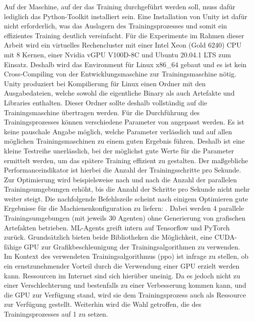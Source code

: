 Auf der Maschine, auf der das Training durchgeführt werden soll, muss dafür lediglich das Python-Toolkit installiert sein.
Eine Installation von Unity ist dafür nicht erforderlich, was das Auslagern des Trainingsprozesses und somit ein effizientes Training deutlich vereinfacht.
Für die Experimente im Rahmen dieser Arbeit wird ein virtuelles Rechencluster mit einer Intel Xeon (Gold 6240) CPU mit 8 Kernen, einer Nvidia vGPU V100D-8C und Ubuntu 20.04.1 LTS zum Einsatz.
Deshalb wird das Environment für Linux x86\_64 gebaut und es ist kein Cross-Compiling von der Entwicklungsmaschine zur Trainingsmaschine nötig.
Unity produziert bei Kompilierung für Linux einen Ordner mit den Ausgabedateien, welche sowohl die eigentliche Binary als auch Artefakte und Libraries enthalten.
Dieser Ordner sollte deshalb vollständig auf die Trainingsmaschine übertragen werden.
Für die Durchführung des Trainingsprozesses können verschiedene Parameter von  angepasst werden.
Es ist keine pauschale Angabe möglich, welche Parameter verlässlich und auf allen möglichen Trainingsmaschinen zu einem guten Ergebnis führen.
Deshalb ist eine kleine Testreihe unerlässlich, bei der möglichst gute Werte für die Parameter ermittelt werden, um das spätere Training effizient zu gestalten.
Der maßgebliche Performanceindikator ist hierbei die Anzahl der Trainingsschritte pro Sekunde.
Zur Optimierung wird beispielsweise nach und nach die Anzahl der parallelen Trainingsumgebungen erhöht, bis die Anzahl der Schritte pro Sekunde nicht mehr weiter steigt.
Die nachfolgende Befehlszeile scheint nach einigem Optimieren gute Ergebnisse für die Machienenkonfiguration zu liefern:
.
Dabei werden 4 parallele Trainingsumgebungen (mit jeweils 30 Agenten) ohne Generierung von grafischen Artefakten betrieben.
ML-Agents greift intern auf Tensorflow und PyTorch zurück.
Grundsätzlich bieten beide Bibliotheken die Möglichkeit, eine CUDA-fähige GPU zur Grafikbeschleunigung der Trainingsalgorithmen zu verwenden.
Im Kontext des verwendeten Trainingsalgorithmus (\ac{ppo}) ist infrage zu stellen, ob ein ernstzunehmender Vorteil durch die Verwendung einer GPU erzielt werden kann.
Ressourcen im Internet sind sich hierüber uneinig.
Da es jedoch nicht zu einer Verschlechterung und bestenfalls zu einer Verbesserung kommen kann, und die GPU zur Verfügung stand, wird sie dem Trainingsprozess auch als Ressource zur Verfügung gestellt.
Weiterhin wird die Wahl getroffen, die  des Trainingsprozesses auf 1 zu setzen.
